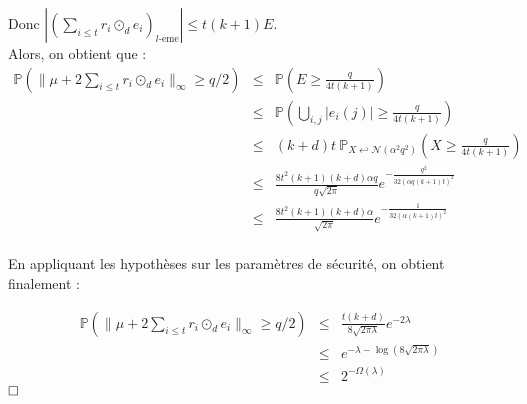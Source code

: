\documentclass[11pt,a4paper]{article}
\begin{document}
Donc $|(\sum_{i \leq t}r_i \odot_d e_i)_{l\text{-eme}}|\leq t(k+1)E$. \\

Alors, on obtient que : 
\begin{eqnarray*}
\mathbb{P}(\|\mu + 2\sum_{i \leq t}r_i \odot_d e_i  \|_\infty \geq q/2 ) &\leq& \mathbb{P}(E \geq \frac{q}{4t(k+1)}) \\
&\leq& \mathbb{P}(\bigcup_{i,j}|e_i(j)| \geq \frac{q}{4t(k+1)}) \\
&\leq& (k+d)t \ \mathbb{P}_{X \hookleftarrow \mathcal{N}(\alpha^2 q^2)}(X \geq \frac{q}{4t(k+1)}) \\
&\leq& \frac{8t^2(k+1)(k+d)\alpha q}{q \sqrt{2\pi}} e^{-\frac{q^2}{32(\alpha q (k+1) t)^2}} \\
&\leq& \frac{8t^2(k+1)(k+d)\alpha}{\sqrt{2\pi}} e^{-\frac{1}{32(\alpha (k+1) t)^2}} \\
\end{eqnarray*}

En appliquant les hypothèses sur les paramètres de sécurité, on obtient finalement :

\begin{eqnarray*}
\mathbb{P}(\|\mu + 2\sum_{i \leq t}r_i \odot_d e_i  \|_\infty \geq q/2 ) &\leq& \frac{t(k+d)}{8\sqrt{2\pi\lambda}}e^{-2\lambda} \\
&\leq& e^{-\lambda-\log(8\sqrt{2\pi\lambda})} \\
&\leq& 2^{-\Omega(\lambda)}
\end{eqnarray*}
$\hfill \square$



\printbibliography[heading=bibintoc, title={Références}]
\end{document}
